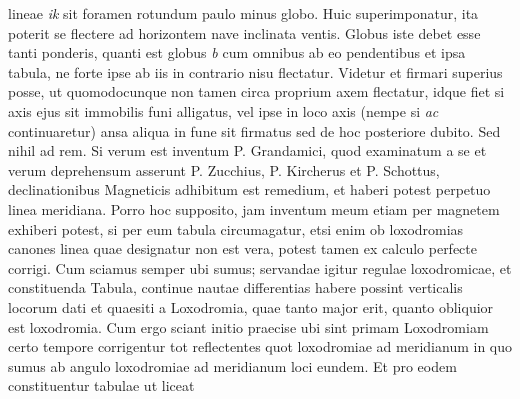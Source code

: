       lineae \textit{ik} sit foramen rotundum paulo minus globo. Huic superimponatur, ita poterit se flectere  ad horizontem nave\protect{} inclinata ventis. Globus iste debet esse tanti ponderis, quanti est globus \textit{b} cum omnibus ab eo pendentibus et ipsa tabula, ne forte ipse ab iis in contrario nisu flectatur. Videtur et firmari superius posse, ut quomodocunque non tamen circa proprium axem flectatur, idque fiet si axis ejus sit immobilis funi alligatus, vel ipse in loco axis (nempe si \textit{ac} continuaretur) ansa aliqua in fune sit firmatus sed de hoc posteriore dubito. Sed nihil ad rem. Si verum est inventum\label{inventum} P. Grandamici\protect{}, quod examinatum a se et verum deprehensum asserunt P. Zucchius\protect{}, P. Kircherus \protect{} et P. Schottus\protect{}, declinationibus\protect{} Magneticis adhibitum est remedium, et haberi potest perpetuo linea meridiana. Porro hoc supposito, jam inventum meum etiam per magnetem\protect{} exhiberi potest, si per eum tabula circumagatur, etsi enim ob loxodromias\protect{} canones linea quae designatur  non est vera, potest tamen ex calculo perfecte corrigi. Cum sciamus semper ubi sumus; servandae igitur regulae loxodromicae\protect{}, et constituenda Tabula,  continue nautae differentias habere possint verticalis locorum dati et quaesiti a Loxodromia\protect{}, quae tanto major erit, quanto obliquior est loxodromia. Cum ergo sciant initio praecise ubi sint  primam Loxodromiam\protect{} certo tempore corrigentur tot  reflectentes quot  loxodromiae\protect{} ad meridianum\protect{}  in quo sumus ab angulo loxodromiae\protect{} ad meridianum\protect{} loci eundem. Et pro eodem constituentur tabulae ut liceat 